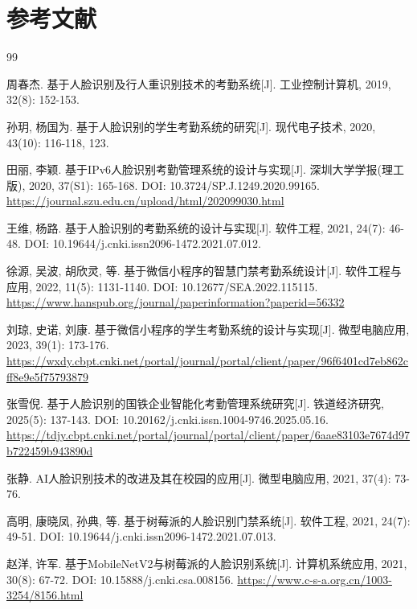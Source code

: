 \documentclass{heuthesis}
\begin{document}
\clearpage
\section*{\centering{}参考文献}

\begin{thebibliography}{99}

周春杰. 基于人脸识别及行人重识别技术的考勤系统[J]. 工业控制计算机, 2019, 32(8): 152-153.

孙玥, 杨国为. 基于人脸识别的学生考勤系统的研究[J]. 现代电子技术, 2020, 43(10): 116-118, 123.

田丽, 李颖. 基于IPv6人脸识别考勤管理系统的设计与实现[J]. 深圳大学学报(理工版), 2020, 37(S1): 165-168. DOI: 10.3724/SP.J.1249.2020.99165. \url{https://journal.szu.edu.cn/upload/html/202099030.html}

王维, 杨路. 基于人脸识别的考勤系统的设计与实现[J]. 软件工程, 2021, 24(7): 46-48. DOI: 10.19644/j.cnki.issn2096-1472.2021.07.012.

徐源, 吴波, 胡欣灵, 等. 基于微信小程序的智慧门禁考勤系统设计[J]. 软件工程与应用, 2022, 11(5): 1131-1140. DOI: 10.12677/SEA.2022.115115. \url{https://www.hanspub.org/journal/paperinformation?paperid=56332}

刘琼, 史诺, 刘康. 基于微信小程序的学生考勤系统的设计与实现[J]. 微型电脑应用, 2023, 39(1): 173-176. \url{https://wxdy.cbpt.cnki.net/portal/journal/portal/client/paper/96f6401cd7eb862cff8e9e5f75793879}

张雪倪. 基于人脸识别的国铁企业智能化考勤管理系统研究[J]. 铁道经济研究, 2025(5): 137-143. DOI: 10.20162/j.cnki.issn.1004-9746.2025.05.16. \url{https://tdjy.cbpt.cnki.net/portal/journal/portal/client/paper/6aae83103e7674d97b722459b943890d}

张静. AI人脸识别技术的改进及其在校园的应用[J]. 微型电脑应用, 2021, 37(4): 73-76.

高明, 康晓凤, 孙典, 等. 基于树莓派的人脸识别门禁系统[J]. 软件工程, 2021, 24(7): 49-51. DOI: 10.19644/j.cnki.issn2096-1472.2021.07.013.

赵洋, 许军. 基于MobileNetV2与树莓派的人脸识别系统[J]. 计算机系统应用, 2021, 30(8): 67-72. DOI: 10.15888/j.cnki.csa.008156. \url{https://www.c-s-a.org.cn/1003-3254/8156.html}


\end{thebibliography}
\end{document}
